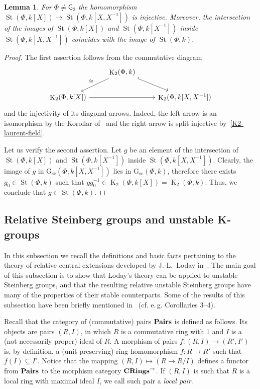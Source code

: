 \documentclass[10pt,a4paper,twoside]{article}
\newtheorem{lemma}{Lemma}
\theoremstyle{remark}
\theoremstyle{definition}
\numberwithin{lemma}{section}
\numberwithin{prop}{section}
\numberwithin{corollary}{section}
\numberwithin{externaltheorem}{section}
\DeclareMathOperator{\St}{St}
\DeclareMathOperator{\K}{K}
\newcommand{\inv}{^{-1}}
\newcommand{\catname}[1]{{\normalfont\textbf{#1}}} %
\newcommand{\GG}{\mathrm{G}_{\mathrm{sc}}}
\newcommand{\rG}{\mathsf{G}}
\numberwithin{equation}{section}
\begin{document}
\begin{lemma} \label{field-injectivity} For $\Phi\neq\rG_2$ the homomorphism $\St(\Phi, k[X]) \to \St(\Phi, k[X, X^{-1}])$ is injective. Moreover, the intersection of the images of $\St(\Phi, k[X])$ and $\St(\Phi, k[X\inv])$ inside $\St(\Phi, k[X, X\inv])$ coincides with the image of $\St(\Phi, k)$. \end{lemma}
\begin{proof} The first assertion follows from the commutative diagram
\[\begin{tikzcd}  & \K_2(\Phi, k) \arrow{dl}[swap]{\cong} \arrow[dr, hookrightarrow] & \\ \K_2(\Phi, k[X]) \arrow{rr} & & \K_2(\Phi, k[X, X^{-1}]) \end{tikzcd} \]
and the injectivity of its diagonal arrows. Indeed, the left arrow is an isomorphism by the Korollar of~\cite[Satz~1]{Re75} and the right arrow is split injective by~\cref{K2-laurent-field}.

Let us verify the second assertion. Let $g$ be an element of the intersection of $\St(\Phi, k[X])$ and $\St(\Phi, k[X\inv])$ inside $\St(\Phi, k[X, X\inv])$.
Clearly, the image of $g$ in $\GG(\Phi, k[X, X\inv])$ lies in $\GG(\Phi, k)$, therefore there exists $g_0 \in \St(\Phi, k)$ such that $gg_0^{-1} \in \K_2(\Phi, k[X]) = \K_2(\Phi, k)$. Thus, we conclude that $g \in \St(\Phi, k)$.
\end{proof}

\subsection{Relative Steinberg groups and unstable K-groups} \label{sec:quillen}
In this subsection we recall the definitions and basic facts pertaining to the theory of relative central extensions developed by J.-L.~Loday in~\cite{Lo78}. The main goal of this subsection is to show that Loday's theory can be applied to unstable Steinberg groups, and that the resulting relative unstable Steinberg groups have many of the properties of their stable counterparts. Some of the results of this subsection have been briefly mentioned in~\cite{S15} (cf. e.\,g. Corollaries 3--4).

Recall that the category of (commutative) pairs $\catname{Pairs}$ is defined as follows. Its objects are pairs $(R, I)$, in which $R$ is a commutative ring with $1$ and $I$ is a (not necessarily proper) ideal of $R$. A morphism of pairs $f \colon (R, I) \to (R', I')$ is, by definition, a (unit-preserving) ring homomorphism $f \colon R \to R'$ such that $f(I) \subseteq I'$. Notice that the mapping $(R, I) \mapsto (R \to R/I)$ defines a functor from $\catname{Pairs}$ to the morphism category $\catname{CRings}^\rightarrow$.
If $(R, I)$ is such that $R$ is a local ring with maximal ideal $I$, we call such pair a {\it local pair}.
\end{document}
